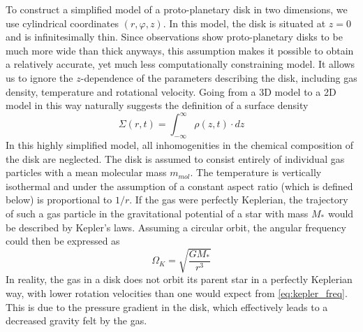     \newpage \noindent
    To construct a simplified model of a proto-planetary disk in two dimensions,
    we use cylindrical coordinates $(r,\varphi,z)$. In this model, the 
    disk is situated at $z=0$ and is infinitesimally thin. Since observations 
    show proto-planetary disks to be much more wide than thick anyways, this 
    assumption makes it possible to obtain a relatively accurate, yet much 
    less computationally constraining model. It allows us to ignore the 
    $z$-dependence of the parameters describing the disk, including gas 
    density, temperature and rotational velocity. Going from a 3D model to a 
    2D model in this way naturally suggests the definition of a surface density
    \begin{equation}
      \Sigma(r,t)=\int_{-\infty}^{\infty}\rho(z,t)\cdot dz
    \end{equation}
    In this highly simplified model, all inhomogenities in the chemical 
    composition of the disk are neglected. The disk is assumed to consist 
    entirely of individual gas particles with a mean molecular mass $m_{mol}$.
    The temperature is vertically isothermal and under the assumption of a 
    constant aspect ratio (which is defined below) is proportional to $1/r$.
    If the gas were perfectly Keplerian, the trajectory of such a gas 
    particle in the gravitational potential of a star with mass $M_*$ would
    be described by Kepler's laws. Assuming a circular orbit, the angular 
    frequency could then be expressed as
    \begin{equation}
      \Omega_K=\sqrt{\frac{G M_*}{r^3}}
      \label{eq:kepler_freq}
    \end{equation}
    In reality, the gas in a disk does not orbit its parent star in a 
    perfectly Keplerian way, 
    with lower rotation velocities than one would expect from 
    \autoref{eq:kepler_freq}. This is due to the pressure gradient in the disk, 
    which effectively leads to a decreased gravity felt by the gas.
